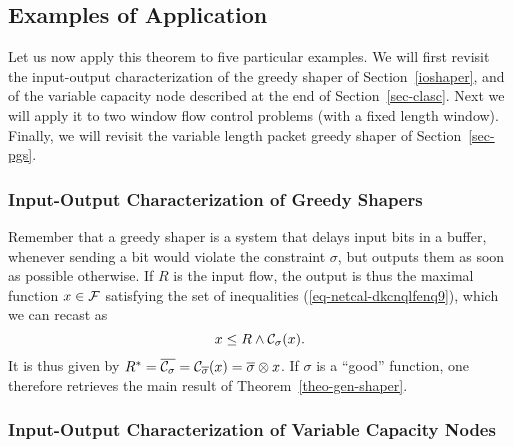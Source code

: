 \subsection{Examples of Application}

Let us now apply this theorem to five particular examples. We will
first revisit the input-output characterization of the greedy
shaper of Section~\ref{ioshaper}, and of the variable capacity
node described at the end of Section~\ref{sec-clasc}. Next we will
apply it to two window flow control problems (with a fixed length
window). Finally, we will revisit the variable length packet
greedy shaper of Section~\ref{sec-pgs}.


\subsubsection{Input-Output Characterization of Greedy Shapers}

Remember that a greedy shaper is a system that delays input bits in a buffer, whenever sending a bit would violate the constraint $\sigma$,
but outputs them as soon as possible otherwise. If $R$ is the input flow, the output is thus the maximal function $x \in \mathcal F$ satisfying the set of inequalities (\ref{eq-netcal-dkcnqlfenq9}), which we can recast as
$$ x \leq R \wedge \mathcal C_{\sigma}(x). $$
It is thus given by $R^* = \overline{\mathcal C_{\sigma}} = \mathcal C_{\overline{\sigma}}(x) = \overline{\sigma} \otimes x $. If $\sigma$ is
a ``good'' function, one therefore retrieves the main result of Theorem~\ref{theo-gen-shaper}.

\subsubsection{Input-Output Characterization of Variable Capacity Nodes}

